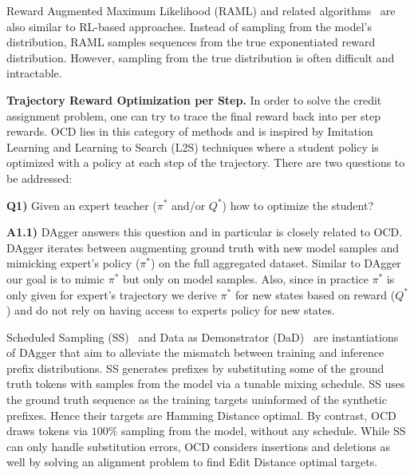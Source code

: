 {Reward Augmented Maximum Likelihood (RAML) \citep{norouzi-nips-2016} and related algorithms~\citep{koyamada2017,ma2017softmax,elbayad2018token,wang2018switchout} are also similar
to RL-based approaches. Instead of sampling from the model's distribution, RAML samples sequences from the true exponentiated reward distribution.
However, sampling from the true distribution is often difficult and intractable. 

\textbf{Trajectory Reward Optimization per Step.} In order to solve the credit assignment problem, one can try to trace the final reward back into per step rewards. OCD lies in this category of methods and is inspired by Imitation Learning and Learning to Search (L2S)
techniques where a student policy is optimized with a policy at each step of the trajectory.
There are two questions to be addressed:

\textbf{Q1)} Given an expert teacher ($\pi^*$ and/or $Q^*$) how to optimize the student?

\textbf{A1.1)} DAgger \citep{ross-aistats-2011} answers this question and in particular is closely
related to OCD. DAgger iterates between augmenting ground truth with new model samples and mimicking expert's policy ($\pi^*$) on the full aggregated dataset. Similar to DAgger our goal is to mimic $\pi^*$ but only on model samples. Also, since in practice $\pi^*$ is only given for expert's trajectory we derive $\pi^*$ for new states based on reward ($Q^*$) and do not rely on having access to experts policy for new states.

Scheduled Sampling (SS)~\citep{bengio-nips-2015} and Data as Demonstrator (DaD)~\citep{dad2015} are instantiations of DAgger that aim to alleviate the mismatch between training and inference prefix distributions. SS generates prefixes by substituting some of the ground truth tokens with samples from the model via a tunable mixing schedule. SS uses the ground truth sequence as the training targets uninformed of the synthetic prefixes. Hence their targets are Hamming Distance optimal. By contrast, OCD draws tokens via $100\%$ sampling from the model, without any schedule. While SS can only handle substitution errors, OCD considers insertions and deletions as well by solving an alignment problem to find Edit Distance optimal targets.

}
